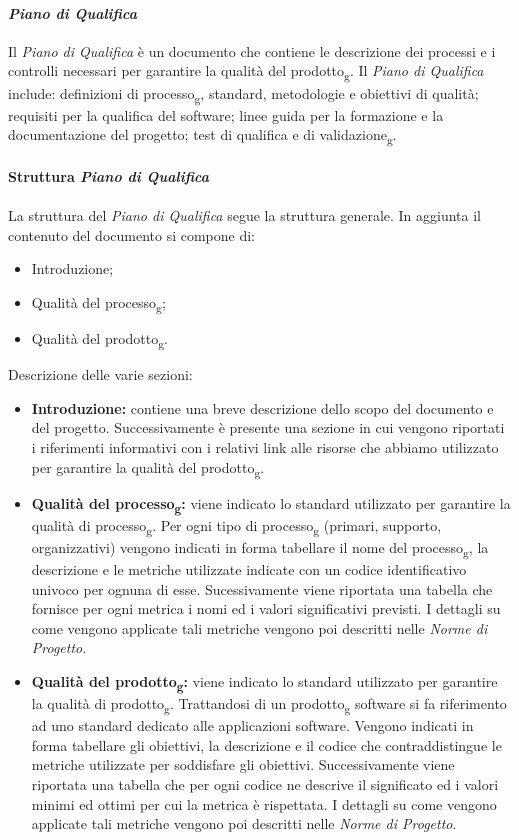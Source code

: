 \paragraph{\textit{Piano di Qualifica}}
Il \textit{Piano di Qualifica} è un documento che contiene le descrizione dei processi e i controlli necessari per garantire la qualità del prodotto\textsubscript{g}. 
Il \textit{Piano di Qualifica} include: definizioni di processo\textsubscript{g}, standard, metodologie e obiettivi di qualità; requisiti per la 
qualifica del software; linee guida per la formazione e la documentazione del progetto; test di qualifica e di validazione\textsubscript{g}.
\\\\
\textbf{Struttura \textit{Piano di Qualifica}}
\\\\
La struttura del \textit{Piano di Qualifica} segue la struttura generale.
In aggiunta il contenuto del documento si compone di:
\begin{itemize}
    \item Introduzione;
    \item Qualità del processo\textsubscript{g};
    \item Qualità del prodotto\textsubscript{g}.
\end{itemize}
\noindent Descrizione delle varie sezioni:
\begin{itemize}
\item \textbf{Introduzione:} contiene una breve descrizione dello scopo del documento e del progetto.
Successivamente è presente una sezione in cui vengono riportati i riferimenti informativi 
con i relativi link alle risorse che abbiamo utilizzato per garantire la qualità del prodotto\textsubscript{g}.

\item \textbf{Qualità del processo\textsubscript{g}:} viene indicato lo standard utilizzato per garantire la qualità di processo\textsubscript{g}.
Per ogni tipo di processo\textsubscript{g} (primari, supporto, organizzativi) vengono indicati in forma tabellare il nome del processo\textsubscript{g}, la descrizione e le metriche utilizzate
indicate con un codice identificativo univoco per ognuna di esse.
Sucessivamente viene riportata una tabella che fornisce per ogni metrica i nomi ed i valori significativi previsti.
I dettagli su come vengono applicate tali metriche vengono poi descritti nelle \textit{Norme di Progetto}.

\item \textbf{Qualità del prodotto\textsubscript{g}:} viene indicato lo standard utilizzato per garantire la qualità di prodotto\textsubscript{g}.
Trattandosi di un prodotto\textsubscript{g} software si fa riferimento ad uno standard dedicato alle applicazioni software.
Vengono indicati in forma tabellare gli obiettivi, la descrizione e il codice che contraddistingue le metriche utilizzate per soddisfare gli obiettivi.
Successivamente viene riportata una tabella che per ogni codice ne descrive il significato ed i valori minimi ed ottimi per cui la metrica è rispettata.
I dettagli su come vengono applicate tali metriche vengono poi descritti nelle \textit{Norme di Progetto}.
\end{itemize}
